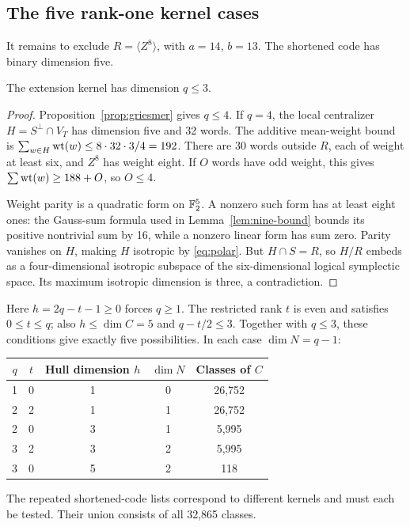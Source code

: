 \subsection{The five rank-one kernel cases}

It remains to exclude \(R=\langle Z^8\rangle\), with \(a=14\),
\(b=13\). The shortened code has binary dimension five.

\begin{lemma}\label{lem:qthree}
The extension kernel has dimension \(q\leq3\).
\end{lemma}
\begin{proof}
Proposition~\ref{prop:griesmer} gives \(q\leq4\). If \(q=4\), the
local centralizer \(H=S^\perp\cap V_T\) has dimension five and
32 words. The additive mean-weight bound is
\(\sum_{w\in H}\operatorname{wt}(w)\leq8\cdot32\cdot3/4=192\).
There are 30 words outside \(R\), each of weight at least six, and
\(Z^8\) has weight eight. If \(O\) words have odd weight, this gives
\(\sum\operatorname{wt}(w)\geq188+O\), so \(O\leq4\).

Weight parity is a quadratic form on \(\mathbb F_2^5\). A nonzero such form
has at least eight ones: the Gauss-sum formula used in
Lemma~\ref{lem:nine-bound} bounds its positive nontrivial sum by 16,
while a nonzero linear form has sum zero. Parity vanishes on
\(H\), making \(H\) isotropic by \eqref{eq:polar}.
But \(H\cap S=R\), so \(H/R\) embeds as a four-dimensional
isotropic subspace of the six-dimensional logical symplectic space.
Its maximum isotropic dimension is three, a contradiction.
\end{proof}

Here \(h=2q-t-1\geq0\) forces \(q\geq1\). The restricted rank
\(t\) is even and satisfies \(0\leq t\leq q\); also
\(h\leq\dim C=5\) and \(q-t/2\leq3\).
Together with \(q\leq3\), these conditions give exactly five possibilities.
In each case \(\dim N=q-1\):
\begin{center}
\begin{tabular}{@{}ccccc@{}}\toprule
\(q\)&\(t\)&Hull dimension \(h\)&\(\dim N\)&Classes of \(C\)\\\midrule
1&0&1&0&26,752\\
2&2&1&1&26,752\\
2&0&3&1&5,995\\
3&2&3&2&5,995\\
3&0&5&2&118\\\bottomrule
\end{tabular}
\end{center}
The repeated shortened-code lists correspond to different kernels and
must each be tested. Their union consists of all 32,865 classes.

